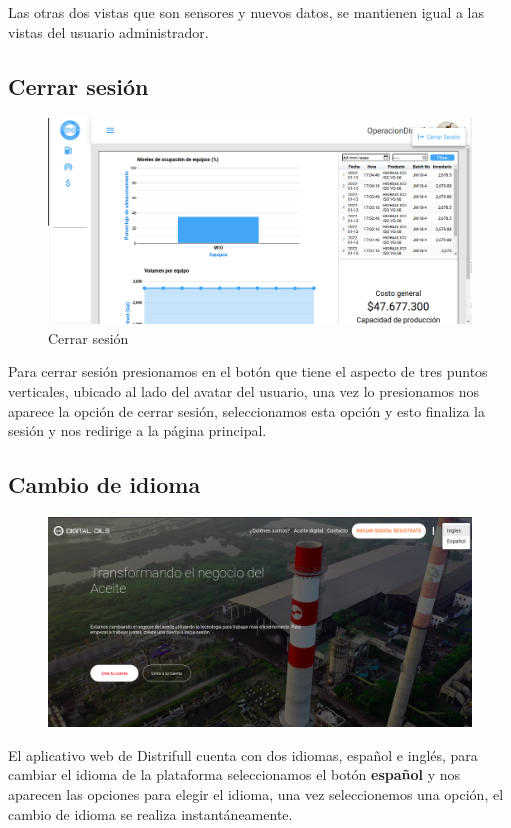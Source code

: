 Las otras dos vistas que son sensores y nuevos datos, se mantienen igual a las vistas del usuario administrador. 

\subsection{Cerrar sesi\'on}
\begin{figure}[h!]
	\centering
	\includegraphics[width=1\linewidth, height=0.3\textheight]{imagenes/cerrarSesion}
	\caption[Cerrar sesi\'on.]{Cerrar sesi\'on}
	\label{fig:cerarsesion}
\end{figure}

Para cerrar sesi\'on presionamos en el bot\'on que tiene el aspecto de tres puntos verticales, ubicado al lado del avatar del usuario, una vez lo presionamos nos aparece la opci\'on de \textcolor{bluedistri}{cerrar sesi\'on}, seleccionamos esta opci\'on y esto finaliza la sesi\'on y nos redirige a la p\'agina principal.
\newpage
\subsection{Cambio de idioma}

\begin{figure}[h!]
	\centering
	\includegraphics[width=1\linewidth, height=0.3\textheight]{imagenes/inicioOneIdioma}
	\caption[\'Area principal.]{}
	\label{fig:iniciooneidioma}
\end{figure}

El aplicativo web de Distrifull cuenta con dos idiomas, espa\~nol e ingl\'es, para cambiar el idioma de la plataforma seleccionamos el bot\'on {\bf espa\~nol} y nos aparecen las opciones para elegir el idioma, una vez seleccionemos una opci\'on, el cambio de idioma se realiza instant\'aneamente.
